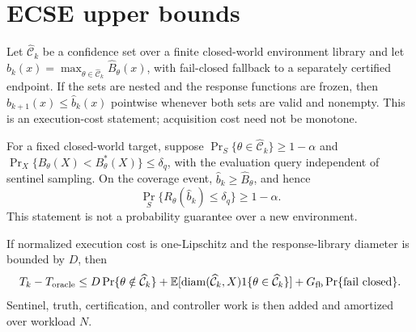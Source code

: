 \section{ECSE upper bounds}
Let $\widehat{\mathcal C}_k$ be a confidence set over a finite closed-world
environment library and let
$\widehat b_k(x)=\max_{\theta\in\widehat{\mathcal C}_k}
\widehat B_\theta(x)$, with fail-closed fallback to a separately certified
endpoint. If the sets are nested and the response functions are frozen,
then $\widehat b_{k+1}(x)\le\widehat b_k(x)$ pointwise whenever both sets
are valid and nonempty. This is an execution-cost statement; acquisition
cost need not be monotone.

For a fixed closed-world target, suppose
$\Pr_S\{\theta\in\widehat{\mathcal C}_k\}\ge1-\alpha$ and
$\Pr_X\{\widehat B_\theta(X)<B^*_\theta(X)\}\le\delta_q$, with the
evaluation query independent of sentinel sampling. On the coverage event,
$\widehat b_k\ge\widehat B_\theta$, and hence
\[
 \Pr_S\{R_\theta(\widehat b_k)\le\delta_q\}\ge1-\alpha.
\]
This statement is not a probability guarantee over a new environment.

If normalized execution cost is one-Lipschitz and the response-library
diameter is bounded by $D$, then
\[
 T_k-T_{\rm oracle}\le
 D\Pr\{\theta\notin\widehat{\mathcal C}_k\}
 +\mathbb E[\operatorname{diam}(\widehat{\mathcal C}_k,X)
             1\{\theta\in\widehat{\mathcal C}_k\}]
 +G_{\rm fb}\Pr\{\text{fail closed}\}.
\]
Sentinel, truth, certification, and controller work is then added and
amortized over workload $N$.

